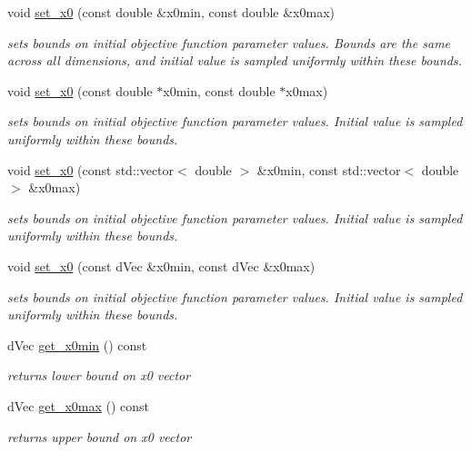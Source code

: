 \begin{DoxyCompactItemize}
void \hyperlink{classlibcmaes_1_1Parameters_a2db4deff995719566b86bfc0c2df4e91}{set\+\_\+x0} (const double \&x0min, const double \&x0max)
\begin{DoxyCompactList}\small\item\em sets bounds on initial objective function parameter values. Bounds are the same across all dimensions, and initial value is sampled uniformly within these bounds. \end{DoxyCompactList}\item 
void \hyperlink{classlibcmaes_1_1Parameters_addda8e395450878e87538df7b4032cbe}{set\+\_\+x0} (const double $\ast$x0min, const double $\ast$x0max)
\begin{DoxyCompactList}\small\item\em sets bounds on initial objective function parameter values. Initial value is sampled uniformly within these bounds. \end{DoxyCompactList}\item 
void \hyperlink{classlibcmaes_1_1Parameters_ac3b37ba000eb460240554230f760039f}{set\+\_\+x0} (const std\+::vector$<$ double $>$ \&x0min, const std\+::vector$<$ double $>$ \&x0max)
\begin{DoxyCompactList}\small\item\em sets bounds on initial objective function parameter values. Initial value is sampled uniformly within these bounds. \end{DoxyCompactList}\item 
void \hyperlink{classlibcmaes_1_1Parameters_acc94e18faebb18dcaa0712a296e76949}{set\+\_\+x0} (const d\+Vec \&x0min, const d\+Vec \&x0max)
\begin{DoxyCompactList}\small\item\em sets bounds on initial objective function parameter values. Initial value is sampled uniformly within these bounds. \end{DoxyCompactList}\item 
d\+Vec \hyperlink{classlibcmaes_1_1Parameters_a1f7532a4bac9543094e7879baf3d73e1}{get\+\_\+x0min} () const 
\begin{DoxyCompactList}\small\item\em returns lower bound on x0 vector \end{DoxyCompactList}\item 
d\+Vec \hyperlink{classlibcmaes_1_1Parameters_adba08aae48f823c1611466ec86ae3b75}{get\+\_\+x0max} () const 
\begin{DoxyCompactList}\small\item\em returns upper bound on x0 vector \end{DoxyCompactList}\item 

\end{DoxyCompactItemize}
